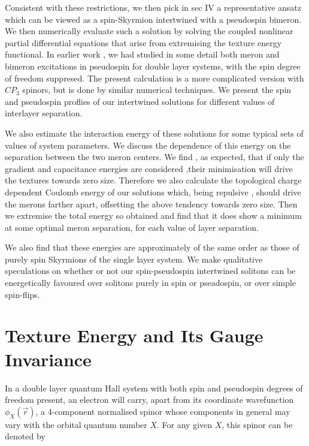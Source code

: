  Consistent with these restrictions, we then pick in sec IV a
representative ansatz which can be viewed as a spin-Skyrmion
intertwined with a pseudospin bimeron. We then numerically
evaluate such a solution by solving the coupled nonlinear
partial differential equations that arise from extremising the
texture energy functional.  In earlier work
\cite{Ghosh1},\cite{Ghosh2} we had studied in some detail both
meron and bimeron excitations in pseudospin for double layer
systems, with the spin degree of freedom suppresed. The present
calculation is a more complicated version with  $CP_{3}$
spinors, but is done by similar numerical techniques. We present
the spin and pseudospin proflies of our intertwined solutions
for different values of interlayer separation.
 
 We also estimate the interaction energy of these solutions for
some typical sets of values of system parameters.  We discuss
the dependence of this energy on the
separation between the two meron centers. We find , as expected, 
that if only the gradient and 
capacitance energies are considered ,their minimisation will drive
the textures towards zero size. Therefore we also calculate the 
topological charge dependent Coulomb energy of
our solutions which, being repulsive ,  should drive the merons farther 
apart, offsetting the above tendency towards zero size.
 Then we extremise the total energy so obtained and find that it does show a
 minimum at some optimal meron separation, for each value of layer 
 separation. 
 
 We also find that these
energies are approximately of the same order as those of purely
spin Skyrmions of the single layer system. We make qualitative speculations
 on whether or not our spin-pseudospin intertwined solitons can be
energetically favoured over solitons purely in spin or
pseadospin, or over simple spin-flips.  
 
\section{Texture Energy and Its Gauge Invariance}
In a double layer quantum Hall system with both spin and pseudospin 
 degrees of freedom present,  an electron 
 will carry, apart from its coordinate wavefunction $\phi_{X}({\vec r})$,
a 4-component normalised spinor whose components 
in general may vary with the orbital
quantum number $X$. For any given $X$, this spinor can be denoted by 



